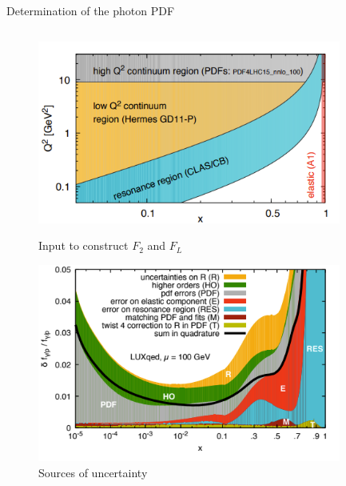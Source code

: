 \documentclass[aspectratio=169, 9pt,t]{beamer}
\begin{document}
\begin{frame}{Determination of the photon PDF}
\begin{columns}[T]
    \begin{column}{0.39\textwidth}
      \vspace*{-2.5em}
      \begin{figure}
        \includegraphics[width=0.89\textwidth]{figures/dataluxqed.png}
        \caption*{Input to construct $F_2$ and $F_L$}
        \includegraphics[width=0.89\textwidth]{figures/luxQED_uncs.png}
        \caption*{Sources of uncertainty}
      \end{figure}
    \end{column}
  \end{columns}
\end{frame}
\end{document}
